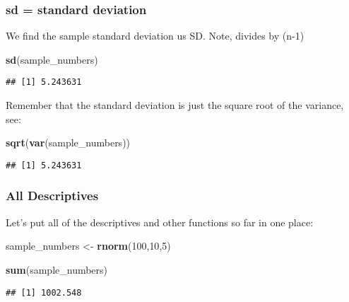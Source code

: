 \documentclass[
]{book}
\newenvironment{Shaded}{\begin{snugshade}}{\end{snugshade}}
\newcommand{\DecValTok}[1]{\textcolor[rgb]{0.00,0.00,0.81}{#1}}
\newcommand{\FunctionTok}[1]{\textcolor[rgb]{0.13,0.29,0.53}{\textbf{#1}}}
\newcommand{\NormalTok}[1]{#1}
\newcommand{\OtherTok}[1]{\textcolor[rgb]{0.56,0.35,0.01}{#1}}
\begin{document}
\hypertarget{sd-standard-deviation}{%
\subsubsection{sd = standard deviation}\label{sd-standard-deviation}}

We find the sample standard deviation us SD. Note, divides by (n-1)

\begin{Shaded}
\begin{Highlighting}[]
\FunctionTok{sd}\NormalTok{(sample\_numbers)}
\end{Highlighting}
\end{Shaded}

\begin{verbatim}
## [1] 5.243631
\end{verbatim}

Remember that the standard deviation is just the square root of the variance, see:

\begin{Shaded}
\begin{Highlighting}[]
\FunctionTok{sqrt}\NormalTok{(}\FunctionTok{var}\NormalTok{(sample\_numbers))}
\end{Highlighting}
\end{Shaded}

\begin{verbatim}
## [1] 5.243631
\end{verbatim}

\hypertarget{all-descriptives}{%
\subsubsection{All Descriptives}\label{all-descriptives}}

Let's put all of the descriptives and other functions so far in one place:

\begin{Shaded}
\begin{Highlighting}[]
\NormalTok{sample\_numbers }\OtherTok{\textless{}{-}} \FunctionTok{rnorm}\NormalTok{(}\DecValTok{100}\NormalTok{,}\DecValTok{10}\NormalTok{,}\DecValTok{5}\NormalTok{)}

\FunctionTok{sum}\NormalTok{(sample\_numbers)}
\end{Highlighting}
\end{Shaded}

\begin{verbatim}
## [1] 1002.548
\end{verbatim}
\end{document}
